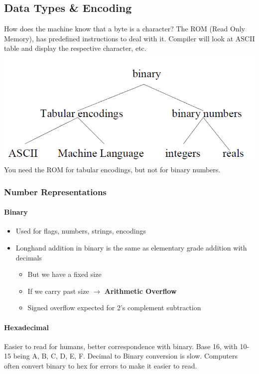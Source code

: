 \documentclass[12 pt]{article}
\begin{document}
	\subsection{Data Types \& Encoding}
	How does the machine know that a byte is a character? The ROM (Read Only Memory), has predefined instructions to deal with it. Compiler will look at ASCII table and display the respective character, etc. \includegraphics[scale=0.3]{btree} You need the ROM for tabular encodings, but not for binary numbers.
	\subsubsection{Number Representations}
	\paragraph{Binary} 
	\begin{itemize}
		\item Used for flags, numbers, strings, encodings
		\item Longhand addition in binary is the same as elementary grade addition with decimals
		\begin{itemize}
			\item But we have a fixed size
			\item If we carry past size $\to$ \textbf{Arithmetic Overflow}
			\item Signed overflow expected for 2's complement subtraction
		\end{itemize}
	\end{itemize}
	\paragraph{Hexadecimal} Easier to read for humans, better correspondence with binary. Base 16, with 10-15 being A, B, C, D, E, F. Decimal to Binary conversion is slow. Computers often convert binary to hex for errors to make it easier to read.
\end{document}
